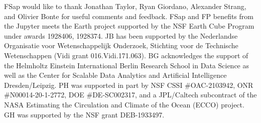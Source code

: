 
FSap would like to thank Jonathan Taylor, Ryan Giordano, Alexander Strang, and Olivier Bonte for useful comments and feedback. 
FSap and FP benefits from the Jupyter meets the Earth project supported by the NSF Earth Cube Program under awards 1928406, 1928374. 
JB has been supported by the Nederlandse Organisatie voor Wetenschappelijk Onderzoek, Stichting voor de Technische Wetenschappen (Vidi grant 016.Vidi.171.063).
BG acknowledges the support of the Helmholtz Einstein International Berlin Research School in Data Science as well as the Center for Scalable Data Analytics and Artificial Intelligence Dresden/Leipzig.
PH was supported in part by NSF CSSI \#OAC-2103942, ONR \#N00014-20-1-2772, DOE \#DE-SC002317, and a JPL/Caltech subcontract of the NASA Estimating the Circulation and Climate of the Ocean (ECCO) project.
GH was supported by the NSF grant DEB-1933497. 

